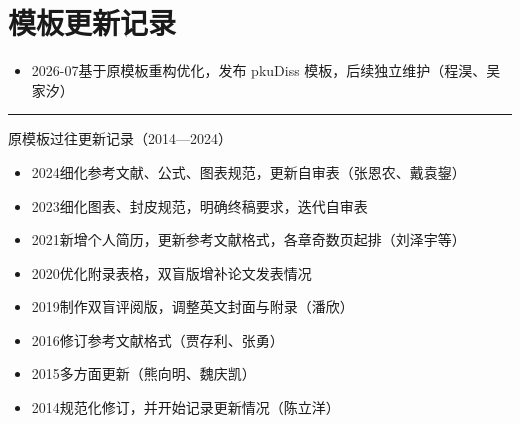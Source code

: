 \chapter{模板更新记录}

\begin{itemize}[left=0pt]
    \item 2026-07\quad 基于原模板重构优化，发布 pkuDiss 模板，后续独立维护（程淏、吴家汐）
\end{itemize}

\vspace{3.0em}
\hrule
\vspace{0.5em}
\noindent 原模板过往更新记录（2014—2024）
\begin{itemize}[left=0pt]
    \item 2024\quad 细化参考文献、公式、图表规范，更新自审表（张恩农、戴袁鋆）
    \item 2023\quad 细化图表、封皮规范，明确终稿要求，迭代自审表
    \item 2021\quad 新增个人简历，更新参考文献格式，各章奇数页起排（刘泽宇等）
    \item 2020\quad 优化附录表格，双盲版增补论文发表情况
    \item 2019\quad 制作双盲评阅版，调整英文封面与附录（潘欣）
    \item 2016\quad 修订参考文献格式（贾存利、张勇）
    \item 2015\quad 多方面更新（熊向明、魏庆凯）
    \item 2014\quad 规范化修订，并开始记录更新情况（陈立洋）
\end{itemize}
